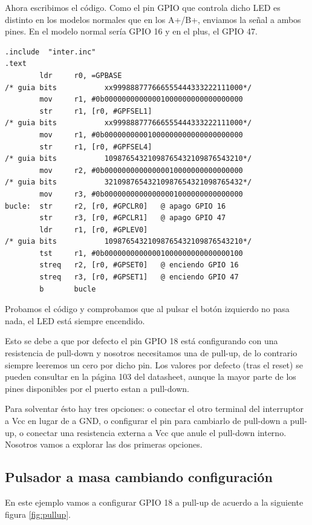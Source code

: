 Ahora escribimos el código. Como el pin GPIO que controla dicho LED es distinto en los
modelos normales que en los A+/B+, enviamos la señal a ambos pines. En el modelo normal
sería GPIO 16 y en el plus, el GPIO 47.

\begin{lstlisting}[caption={apend1.s},label={lst:codigoApendice_1}]
        .include  "inter.inc"
.text
        ldr     r0, =GPBASE
/* guia bits           xx999888777666555444333222111000*/
        mov     r1, #0b00000000000001000000000000000000
        str     r1, [r0, #GPFSEL1]
/* guia bits           xx999888777666555444333222111000*/
        mov     r1, #0b00000000001000000000000000000000
        str     r1, [r0, #GPFSEL4]
/* guia bits           10987654321098765432109876543210*/
        mov     r2, #0b00000000000000010000000000000000
/* guia bits           32109876543210987654321098765432*/
        mov     r3, #0b00000000000000001000000000000000
bucle:  str     r2, [r0, #GPCLR0]   @ apago GPIO 16
        str     r3, [r0, #GPCLR1]   @ apago GPIO 47
        ldr     r1, [r0, #GPLEV0]
/* guia bits           10987654321098765432109876543210*/
        tst     r1, #0b00000000000001000000000000000100
        streq   r2, [r0, #GPSET0]   @ enciendo GPIO 16
        streq   r3, [r0, #GPSET1]   @ enciendo GPIO 47
        b       bucle
\end{lstlisting}

Probamos el código y comprobamos que al pulsar el botón izquierdo no pasa nada,
el LED está siempre encendido.

Esto se debe a que por defecto el pin GPIO 18 está configurando con una resistencia de
pull-down y nosotros necesitamos una de pull-up, de lo contrario siempre leeremos un cero
por dicho pin. Los valores por defecto (tras el reset) se pueden consultar en la página
103 del datasheet, aunque la mayor parte de los pines disponibles por el puerto estan
a pull-down.

Para solventar ésto hay tres opciones: o conectar el otro terminal del interruptor a Vcc en
lugar de a GND, o configurar el pin para cambiarlo de pull-down a pull-up, o conectar una
resistencia externa a Vcc que anule el pull-down interno. Nosotros vamos a explorar las dos
primeras opciones.

\subsection{Pulsador a masa cambiando configuración}

En este ejemplo vamos a configurar GPIO 18 a pull-up de acuerdo a la siguiente
figura \ref{fig:pullup}.

